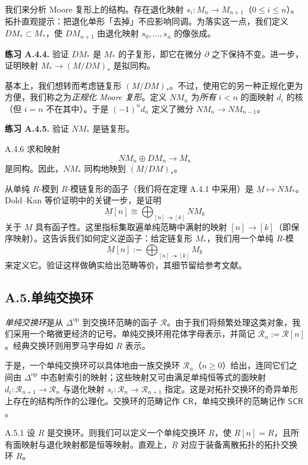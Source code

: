 我们来分析 Moore 复形上的结构。存在退化映射 $s_i\colon M_n\to M_{n+1}$（$0\le i\le n$）。拓扑直观提示：把退化单形「去掉」不应影响同调。为落实这一点，我们定义 $DM_*\subset M_*$，使 $DM_{n+1}$ 由退化映射 $s_0,\dots,s_n$ 的像张成。

\medskip\noindent\textbf{练习 A.4.4.} 验证 $DM_*$ 是 $M_*$ 的子复形，即它在微分 $\partial$ 之下保持不变。进一步，证明映射 $M_*\to(M/DM)_*$ 是拟同构。

基本上，我们想转而考虑链复形 $(M/DM)_*$。不过，使用它的另一种正规化更为方便，我们称之为\emph{正规化 Moore 复形}。定义 $NM_n$ 为\emph{所有} $i<n$ 的面映射 $d_i$ 的核（但 $i=n$ 不在其中）。于是 $(-1)^nd_n$ 定义了微分 $NM_n\to NM_{n-1}$。

\medskip\noindent\textbf{练习 A.4.5.} 验证 $NM_*$ 是链复形。

\begin{rem}{A.4.6}\label{thm:a6-07-1}
求和映射
\[
NM_n\oplus DM_n\to M_n
\]
是同构。因此，$NM_*$ 同构地映到 $(M/DM)_*$。
\end{rem}

从单纯 $R$-模到 $R$-模链复形的函子（我们将在定理 A.4.1 中采用）是 $\underline M\mapsto NM_*$。Dold--Kan 等价证明中的关键一步，是证明
\[
\underline{M}[n]\cong\bigoplus_{[n]\twoheadrightarrow[k]}NM_k
\]
关于 $\underline M$ 具有函子性。这里指标集取遍单纯范畴中满射的映射 $[n]\to[k]$（即保序映射）。这告诉我们如何定义逆函子：给定链复形 $M_*$，我们用一个单纯 $R$-模
\[
\underline{M}[n]:=\bigoplus_{[n]\twoheadrightarrow[k]}M_k
\]
来定义它。验证这样做确实给出范畴等价，其细节留给参考文献。

\subsection*{A.5.\quad 单纯交换环}

\emph{单纯交换环}是从 $\Delta^{\mathrm{op}}$ 到交换环范畴的函子 $\mathcal R$。由于我们将频繁处理这类对象，我们采用一个略微更经济的记号。单纯交换环用花体字母表示，并简记 $\mathcal R_n:=\mathcal R[n]$。经典交换环则用罗马字母如 $R$ 表示。

于是，一个单纯交换环可以具体地由一族交换环 $\mathcal R_n$（$n\ge0$）给出，连同它们之间由 $\Delta^{\mathrm{op}}$ 中态射索引的映射；这些映射又可由满足单纯恒等式的面映射 $d_i\colon\mathcal R_{n+1}\to\mathcal R_n$ 与退化映射 $s_i\colon\mathcal R_n\to\mathcal R_{n+1}$ 指定。这是对拓扑交换环的奇异单形上存在的结构所作的公理化。交换环的范畴记作 $\mathsf{CR}$，单纯交换环的范畴记作 $\mathsf{SCR}$。

\begin{exam}{A.5.1}\label{thm:a6-07-2}
设 $R$ 是交换环。则我们可以定义一个单纯交换环 $\underline R$，使 $\underline R[n]=R$，且所有面映射与退化映射都是恒等映射。直观上，$\underline R$ 对应于装备离散拓扑的拓扑交换环 $R$。
\end{exam}

